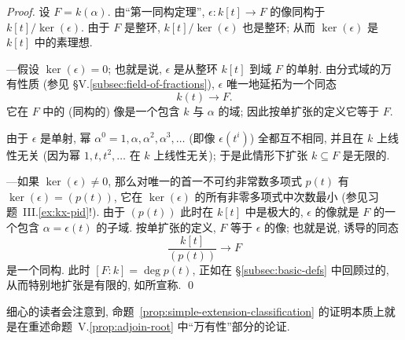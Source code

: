 \begin{proof}
设 $F=k(\alpha)$. 由``第一同构定理'', $\epsilon:k[t]\to F$ 的像同构于 $k[t]/\ker(\epsilon)$. 由于 $F$ 是整环, $k[t]/\ker(\epsilon)$ 也是整环; 从而 $\ker(\epsilon)$ 是 $k[t]$ 中的素理想.

—假设 $\ker(\epsilon)=0$; 也就是说, $\epsilon$ 是从整环 $k[t]$ 到域 $F$ 的单射. 由分式域的万有性质 (参见 §V.\ref{subsec:field-of-fractions}), $\epsilon$ 唯一地延拓为一个同态
\[
k(t)\to F.
\]
它在 $F$ 中的 (同构的) 像是一个包含 $k$ 与 $\alpha$ 的域; 因此按单扩张的定义它等于 $F$.

由于 $\epsilon$ 是单射, 幂 $\alpha^0=1,\alpha,\alpha^2,\alpha^3,\ldots$ (即像 $\epsilon(t^i)$) 全都互不相同, 并且在 $k$ 上线性无关 (因为幂 $1,t,t^2,\ldots$ 在 $k$ 上线性无关); 于是此情形下扩张 $k\subseteq F$ 是无限的.

—如果 $\ker(\epsilon)\neq 0$, 那么对唯一的首一不可约非常数多项式 $p(t)$ 有 $\ker(\epsilon)=(p(t))$, 它在 $\ker(\epsilon)$ 的所有非零多项式中次数最小 (参见习题~III.\ref{ex:kx-pid}!). 由于 $(p(t))$ 此时在 $k[t]$ 中是极大的, $\epsilon$ 的像就是 $F$ 的一个包含 $\alpha=\epsilon(t)$ 的子域. 按单扩张的定义, $F$ 等于 $\epsilon$ 的像; 也就是说, 诱导的同态
\[
\frac{k[t]}{(p(t))}\to F
\]
是一个同构. 此时 $[F:k]=\deg p(t)$, 正如在 §\ref{subsec:basic-defs} 中回顾过的, 从而特别地扩张是有限的, 如所宣称. \qed
\end{proof}

细心的读者会注意到, 命题~\ref{prop:simple-extension-classification} 的证明本质上就是在重述命题~V.\ref{prop:adjoin-root} 中``万有性''部分的论证.

